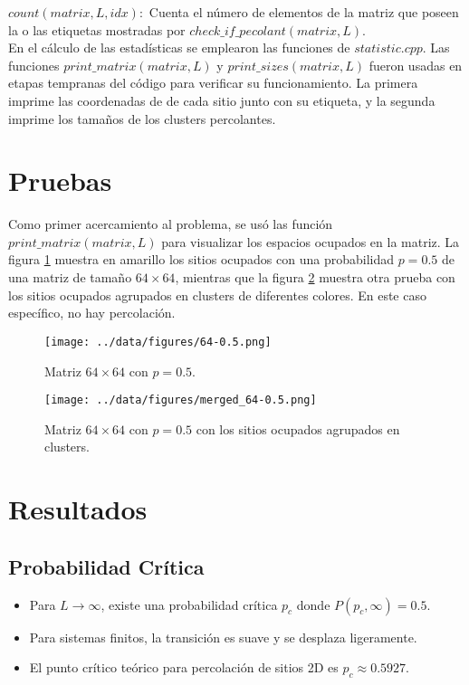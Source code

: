 \documentclass[10pt,twocolumn]{article}
\begin{document}
    $count(matrix, L, idx):$ Cuenta el número de elementos de la matriz que poseen la o las etiquetas mostradas por
    $check\_if\_pecolant(matrix, L)$.\\

    En el cálculo de las estadísticas se emplearon las funciones de $statistic.cpp$. Las funciones $print\_matrix(matrix, L)$
    y $print\_sizes(matrix, L)$ fueron usadas en etapas tempranas del código para verificar su funcionamiento. La primera 
    imprime las coordenadas de de cada sitio junto con su etiqueta, y la segunda imprime los tamaños de los clusters
    percolantes.

\section{Pruebas}
    Como primer acercamiento al problema, se usó las función $print\_matrix(matrix, L)$ para visualizar los espacios ocupados
    en la matriz. La figura \ref{64-0.5} muestra en amarillo los sitios ocupados con una probabilidad $p = 0.5$ de una matriz
    de tamaño $64\times 64$, mientras que la figura \ref{merged 64-0.5} muestra otra prueba con los sitios ocupados agrupados
    en clusters de diferentes colores. En este caso específico, no hay percolación. 
   \begin{figure}[htbp]
    \centering
    \texttt{[image: ../data/figures/64-0.5.png]}
    \caption{Matriz $64\times 64$ con $p = 0.5$.}
    \label{64-0.5} 
   \end{figure} 

   \begin{figure}[htbp]
    \centering
    \texttt{[image: ../data/figures/merged\_64-0.5.png]}
    \caption{Matriz $64\times 64$ con $p = 0.5$ con los sitios ocupados agrupados en clusters.}
    \label{merged 64-0.5} 
   \end{figure} 

\section{Resultados}

\subsection*{Probabilidad Crítica}
\begin{itemize}
    \item Para $L \to \infty$, existe una probabilidad crítica $p_c$ donde $P(p_c, \infty) = 0.5$.
    \item Para sistemas finitos, la transición es suave y se desplaza ligeramente.
    \item El punto crítico teórico para percolación de sitios 2D es $p_c \approx 0.5927$.
\end{itemize}
\end{document}
